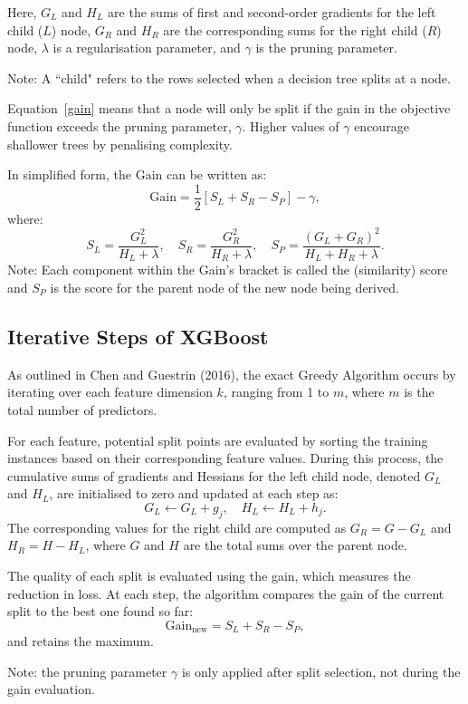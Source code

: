 \documentclass[11pt]{report} %
\begin{document}
Here, \( G_L \) and \( H_L \) are the sums of first and second-order gradients for the left child ($L$) node, \( G_R \) and \( H_R \) are the corresponding sums for the right child ($R$) node, \( \lambda \) is a regularisation parameter, and \( \gamma \) is the pruning parameter.\cite{chen2016xgboost} 

\noindent Note: A ``child" refers to the rows selected when a decision tree splits at a node. 

Equation~\ref{gain} means that a node will only be split if the gain in the objective function exceeds the pruning parameter, \( \gamma \). Higher values of \( \gamma \) encourage shallower trees by penalising complexity.

In simplified form, the Gain can be written as:
\[
\text{Gain} = \frac{1}{2} \left[ S_L + S_R - S_P \right] - \gamma,
\]
where:
\[
S_L = \frac{G_L^2}{H_L + \lambda}, \quad S_R = \frac{G_R^2}{H_R + \lambda}, \quad S_P = \frac{(G_L + G_R)^2}{H_L + H_R + \lambda}.
\]
Note: Each component within the Gain's bracket is called the (similarity) score and $S_P$ is the score for the parent node of the new node being derived.


\subsection{Iterative Steps of XGBoost}
\label{iterative}
As outlined in Chen and Guestrin (2016), the exact Greedy Algorithm occurs by iterating over each feature dimension \( k \), ranging from 1 to \( m \), where \( m \) is the total number of predictors. 

For each feature, potential split points are evaluated by sorting the training instances based on their corresponding feature values. During this process, the cumulative sums of gradients and Hessians for the left child node, denoted \( G_L \) and \( H_L \), are initialised to zero and updated at each step as:
\[ 
G_L \gets G_L + g_j, \quad H_L \gets H_L + h_j.
\] 
The corresponding values for the right child are computed as \( G_R = G-G_L \) and \( H_R = H-H_L \), where \( G \) and \( H \) are the total sums over the parent node.

The quality of each split is evaluated using the gain, which measures the reduction in loss. At each step, the algorithm compares the gain of the current split to the best one found so far:
\[
\text{Gain}_{\text{new}} = S_L + S_R - S_P,
\]
and retains the maximum.

\noindent Note: the pruning parameter \( \gamma \) is only applied after split selection, not during the gain evaluation.
\end{document}
